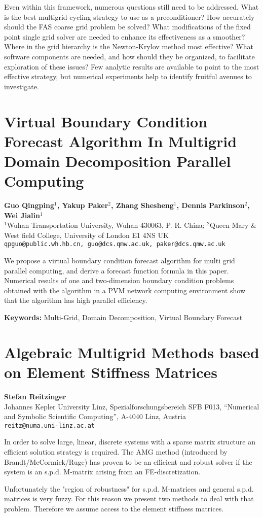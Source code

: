 \documentclass[11pt]{article}
\newcommand{\nextab}[4]{
	\section{#2}
	{\bf #1} \\ \nopagebreak
	{#3} \\ \nopagebreak
	{\tt #4} \nopagebreak
	}
\begin{document}
Even within this framework, numerous questions still need to be
addressed.  What is the best multigrid cycling strategy to use as a
preconditioner?  How accurately should the FAS coarse grid problem be
solved?  What modifications of the fixed point single grid solver are
needed to enhance its effectiveness as a smoother? Where in the grid
hierarchy is the Newton-Krylov method most effective?  What software
components are needed, and how should they be organized, to facilitate
exploration of these issues?  Few analytic results are available to
point to the most effective strategy, but numerical experiments help
to identify fruitful avenues to investigate.




\nextab{Guo Qingping$^1$, Yakup Paker$^2$, Zhang Shesheng$^1$,
		Dennis Parkinson$^2$, Wei Jialin$^1$}
	{Virtual Boundary Condition Forecast Algorithm
		In Multigrid Domain Decomposition Parallel Computing}
	{$^1$Wuhan Transportation University, Wuhan 430063, P. R. China;
	$^2$Queen Mary \& West field College, University of London E1 4NS UK}
	{qpguo@public.wh.hb.cn, guo@dcs.qmw.ac.uk, paker@dcs.qmw.ac.uk}

We propose a virtual boundary condition forecast algorithm for multi
grid parallel computing, and derive a forecast function formula in this
paper. Numerical results of one and two-dimension boundary condition
problems obtained with the algorithm in a PVM network computing
environment show that the algorithm has high parallel efficiency.

{\bf Keywords:}
Multi-Grid, Domain Decomposition, Virtual Boundary Forecast



\nextab{Stefan Reitzinger}
	{Algebraic Multigrid Methods based on Element Stiffness Matrices}
	{Johannes Kepler University Linz,
		Spezialforschungsbereich SFB F013,
		``Numerical and Symbolic Scientific Computing'',
		A-4040 Linz, Austria}
	{reitz@numa.uni-linz.ac.at}

In order to solve large, linear, discrete systems with a sparse matrix
structure an efficient solution strategy is required. The AMG method (introduced
by Brandt/McCormick/Ruge) has proven to be an efficient and robust solver
if the system is an s.p.d. M-matrix arising from an FE-discretization.

Unfortunately the "region of robustness" for s.p.d. M-matrices and
general s.p.d. matrices is very fuzzy. For this reason we present two methods
to deal with that problem. Therefore we assume access to the element stiffness
matrices.
\end{document}
